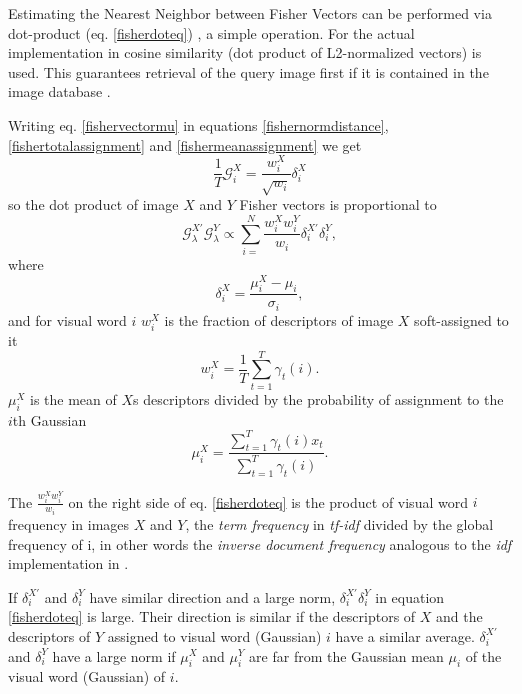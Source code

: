 \documentclass[english,12pt,a4paper,pdftex,elec,utf8]{aaltothesis}
\begin{document}
Estimating the Nearest Neighbor between Fisher Vectors can be performed via dot-product (eq. \ref{fisherdoteq}) \cite{Perronnin2010a}, a simple operation. For the actual implementation in \cite{Perronnin2010a} cosine similarity (dot product of L2-normalized vectors) is used. This guarantees retrieval of the query image first if it is contained in the image database \cite{Perronnin2010a}.

Writing eq. \ref{fishervectormu} in equations \ref{fishernormdistance}, \ref{fishertotalassignment} and \ref{fishermeanassignment} we get
\begin{equation}\label{fisherrewrite}
\frac{1}{T}\mathcal{G}_i^X=\frac{w_i^X}{\sqrt{w_i}}\delta_i^X
\end{equation}
so the dot product of image $X$ and $Y$ Fisher vectors is proportional to
\begin{equation}\label{fisherdoteq}
\mathcal{G}_\lambda^{X'}\mathcal{G}_\lambda^Y \propto \sum_{i=}^N\frac{w_i^Xw_i^Y}{w_i}\delta_i^{X'}\delta_i^Y,
\end{equation}
where
\begin{equation}\label{fishernormdistance}
\delta_i^X = \frac{\mu_i^X - \mu_i}{\sigma_i},
\end{equation}
and for visual word $i$ $w_i^X$ is the fraction of descriptors of image $X$ soft-assigned to it
\begin{equation}\label{fishertotalassignment}
w_i^X = \frac{1}{T}\sum_{t=1}^T\gamma_t(i).
  \end{equation}
$\mu_i^X$ is the mean of $X$s descriptors divided by the probability of assignment to the $i$th Gaussian
\begin{equation}\label{fishermeanassignment}
\mu_i^X=\frac{\sum_{t=1}^T\gamma_t(i)x_t}{\sum_{t=1}^T\gamma_t(i)}.
\end{equation}

The $\frac{w_i^Xw_i^Y}{w_i}$ on the right side of eq. \ref{fisherdoteq} is the product of visual word $i$ frequency in images $X$ and $Y$, the \emph{term frequency} in \emph{tf-idf} divided by the global frequency of i, in other words the \emph{inverse document frequency} analogous to the \emph{idf} implementation in \cite{Sivic2003}.

If $\delta_i^{X'}$ and $\delta_i^{Y}$ have similar direction and a large norm, $\delta_i^{X'}\delta_i^{Y}$ in equation \ref{fisherdoteq} is large. Their direction is similar if the descriptors of $X$ and the descriptors of $Y$ assigned to visual word (Gaussian) $i$ have a similar average. $\delta_i^{X'}$ and $\delta_i^{Y}$ have a large norm if $\mu_i^X$ and $\mu_i^Y$ are far from the Gaussian mean $\mu_i$ of the visual word (Gaussian) of $i$. \cite{Perronnin2010a}
\end{document}
